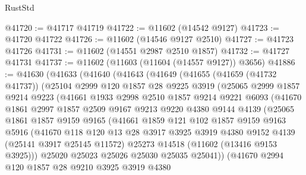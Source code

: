 \begin{lexlean}{RustStd}
\begin{coremodule}
@41720 := @41717 @41719
@41722 := @11602 (@14542 @9127)
@41723 := @41720 @41722
@41726 := @11602 (@14546 @9127 @2510)
@41727 := @41723 @41726
@41731 := @11602 (@14551 @2987 @2510 @1857)
@41732 := @41727 @41731
@41737 := @11602 (@11603 (@11604 (@14557 @9127)) @3656)
@41886 := @41630
    (@41633
      (@41640
        (@41643
          (@41649
            (@41655
              (@41659 (@41732 @41737))
              (@25104
                @2999
                @120
                @1857
                @28
                @9225
                @3919
                (@25065
                  @2999
                  @1857
                  @9214
                  @9223
                  (@41661
                    @1933
                    @2998
                    @2510
                    @1857
                    @9214
                    @9221
                    @6093
                    (@41670
                      @1861
                      @2997
                      @1857
                      @2509
                      @9167
                      @9213
                      @9220
                      @4380
                      @9144
                      @4139
                      (@25065
                        @1861
                        @1857
                        @9159
                        @9165
                        (@41661
                          @1859
                          @121
                          @102
                          @1857
                          @9159
                          @9163
                          @5916
                          (@41670
                            @118
                            @120
                            @13
                            @28
                            @3917
                            @3925
                            @3919
                            @4380
                            @9152
                            @4139
                            (@25141 @3917 @25145 @11572)
                            @25273
                            @14518
                            (@11602 (@13416 @9153 @3925)))
                          @25020
                          @25023
                          @25026
                          @25030
                          @25035
                          @25041))
                      (@41670
                        @2994
                        @120
                        @1857
                        @28
                        @9210
                        @3925
                        @3919
                        @4380

\end{coremodule}
\end{lexlean}
